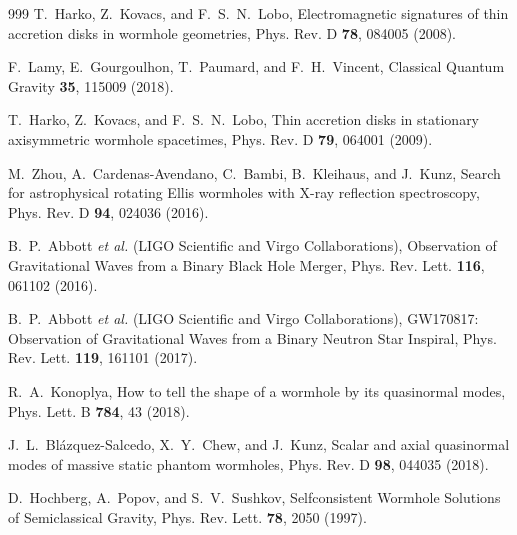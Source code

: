 \documentclass[aps,preprint,groupedaddress,nofootinbib,superscriptaddress,showkeys,showpacs,eqsecnum,amsmath,amssymb]{revtex4-1}
\begin{document}
\begin{thebibliography}{999}
T.~Harko, Z.~Kovacs, and F.~S.~N.~Lobo,
Electromagnetic signatures of thin accretion disks in wormhole geometries,
Phys. Rev. D \textbf{78}, 084005 (2008).

F.~Lamy, E.~Gourgoulhon, T.~Paumard, and F.~H.~Vincent,
Classical Quantum Gravity \textbf{35}, 115009 (2018).

T.~Harko, Z.~Kovacs, and F.~S.~N.~Lobo,
Thin accretion disks in stationary axisymmetric wormhole spacetimes,
Phys. Rev. D \textbf{79}, 064001 (2009).

M.~Zhou, A.~Cardenas-Avendano, C.~Bambi, B.~Kleihaus, and J.~Kunz,
Search for astrophysical rotating Ellis wormholes with X-ray reflection spectroscopy,
Phys. Rev. D \textbf{94}, 024036 (2016).

B.~P.~Abbott \textit{et al.} (LIGO Scientific and Virgo Collaborations), Observation of Gravitational Waves from a Binary Black Hole Merger,
Phys. Rev. Lett. \textbf{116}, 061102 (2016).

B.~P.~Abbott \textit{et al.} (LIGO Scientific and Virgo Collaborations), GW170817: Observation of Gravitational Waves from a Binary Neutron Star Inspiral,
Phys. Rev. Lett. \textbf{119}, 161101 (2017).

R.~A.~Konoplya, How to tell the shape of a wormhole by its quasinormal modes,
Phys. Lett. B \textbf{784}, 43 (2018).

J.~L.~Bl\'azquez-Salcedo, X.~Y.~Chew, and J.~Kunz, Scalar and axial quasinormal modes of massive static phantom wormholes,
Phys. Rev. D \textbf{98}, 044035 (2018).



D.~Hochberg, A.~Popov, and S.~V.~Sushkov, Selfconsistent Wormhole Solutions of Semiclassical Gravity,
Phys. Rev. Lett. \textbf{78}, 2050 (1997).



\end{thebibliography}
\end{document}
